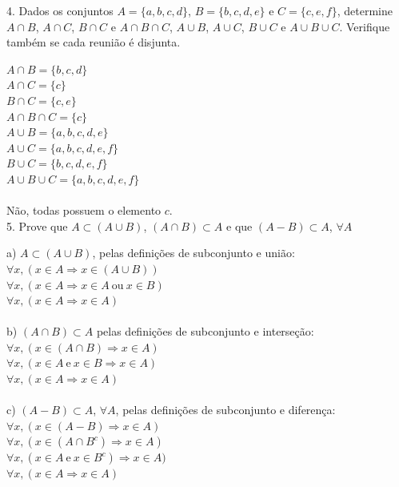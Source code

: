 \documentclass[12pt]{article}
\begin{document}
  	4. Dados os conjuntos $A = \{a, b, c, d\}$, $B = \{b, c, d, e\}$ e $C = \{c, e, f\}$, determine $A \cap B$, $A \cap C$, $B \cap C$
  	e $A \cap B \cap C$, $A \cup B$, $A \cup C$, $B \cup C$ e $A \cup B \cup C$. Verifique também se cada reunião é disjunta.\\
  	\vspace{12pt}
  	
  	\noindent $A \cap B = \{b,c,d\}$\\
  	$A \cap C = \{c\}$\\
  	$B \cap C = \{c, e\}$\\
  	$A \cap B \cap C = \{c\}$\\
  	$A \cup B = \{a,b,c,d,e\}$\\
  	$A \cup C = \{a,b,c,d,e,f\}$\\
  	$B \cup C = \{b,c,d,e,f\}$\\
  	$A \cup B \cup C = \{a,b,c,d,e,f\}$\\\\
  	Não, todas possuem o elemento $c$.\\
  	 
  	5.  Prove que $A \subset (A \cup B)$, $(A \cap B) \subset A$ e que $(A-B) \subset A$, $\forall A$\\
  	\vspace{12pt}
  	
  	\noindent a) $A \subset (A \cup B)$, pelas definições de subconjunto e união:\\
  	$\forall x, (x \in A \Rightarrow x \in (A \cup B)) $\\
  	$\forall x, (x \in A \Rightarrow x \in A\:\text{ou}\: x \in B) $\\
  	$\forall x, (x \in A \Rightarrow x \in A)$\\\\
  	
  	\noindent b) $(A \cap B) \subset A$ pelas definições de subconjunto e interseção:\\
  	$\forall x, (x \in (A \cap B) \Rightarrow x \in A)$\\
  	$\forall x, (x \in A\:\text{e}\:x \in B \Rightarrow x \in A)$\\
  	$\forall x, (x \in A \Rightarrow x \in A)$\\\\
  	
  	\noindent c) $(A-B) \subset A$, $\forall A$, pelas definições de subconjunto e diferença:\\
  	$\forall x, (x \in (A-B) \Rightarrow x \in A)$\\
  	$\forall x, (x \in (A \cap B^{c}) \Rightarrow x \in A)$\\
  	$\forall x, (x \in A\:\text{e}\: x \in B^{c}) \Rightarrow x \in A)$\\
  	$\forall x, (x \in A \Rightarrow x \in A)$\\
  	
\end{document}
